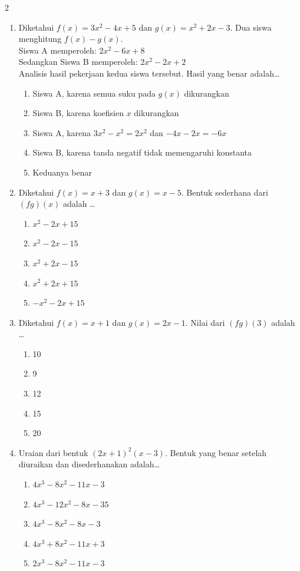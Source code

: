 \documentclass[10pt,a4paper]{article}
\begin{document}
\begin{multicols}{2}
\begin{enumerate}
    \item Diketahui $f(x)=3x^2-4x+5$ dan $g(x)=x^2+2x-3$. Dua siswa menghitung $f(x)-g(x)$.\\
    Siswa A memperoleh: $2x^2-6x+8$\\
    Sedangkan Siswa B memperoleh: $2x^2-2x+2$\\
    Analisis hasil pekerjaan kedua siswa tersebut. Hasil yang benar adalah\dots
    \begin{enumerate}
        \item Siswa A, karena semua suku pada $g(x)$ dikurangkan
        \item Siswa B, karena koefisien $x$ dikurangkan
        \item Siswa A, karena $3x^2-x^2=2x^2$ dan $-4x-2x=-6x$
        \item Siswa B, karena tanda negatif tidak memengaruhi konstanta
        \item Keduanya benar
    \end{enumerate}

    \item Diketahui $f(x)=x+3$ dan $g(x)=x-5$. Bentuk sederhana dari $(fg)(x)$ adalah \dots
    \begin{enumerate}
        \item $x^2-2x+15$
        \item $x^2-2x-15$
        \item $x^2+2x-15$
        \item $x^2+2x+15$
        \item $-x^2-2x+15$
    \end{enumerate}

    \item Diketahui $f(x)=x+1$ dan $g(x)=2x-1$. Nilai dari $(fg)(3)$ adalah \dots
    \begin{enumerate}
        \item 10
        \item 9
        \item 12
        \item 15
        \item 20
    \end{enumerate}

    \item Uraian dari bentuk $(2x+1)^2(x-3)$. Bentuk yang benar setelah diuraikan dan disederhanakan adalah\dots
    \begin{enumerate}
        \item $4x^3-8x^2-11x-3$
        \item $4x^3-12x^2-8x-35$
        \item $4x^3-8x^2-8x-3$
        \item $4x^3+8x^2-11x+3$
        \item $2x^3-8x^2-11x-3$
    \end{enumerate}


\end{enumerate}
\end{multicols}
\end{document}
